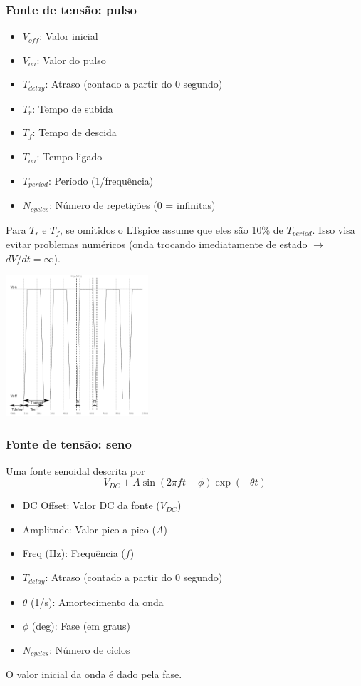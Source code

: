 \documentclass{beamer}
\begin{document}
\begin{frame} %
\frametitle{Fonte de tensão: pulso}
\begin{itemize}
\item {$V_{off}$}: Valor inicial
\item {$V_{on}$}: Valor do pulso
\item {$T_{delay}$}: Atraso (contado a partir do 0 segundo)
\item {$T_{r}$}: Tempo de subida 
\item {$T_{f}$}: Tempo de descida
\item {$T_{on}$}: Tempo ligado
\item {$T_{period}$}: Período (1/frequência)
\item {$N_{cycles}$}: Número de repetições (0 = infinitas)
\end{itemize}
Para $T_r$ e $T_f$, se omitidos o LTspice assume que eles são 10\% de $T_{period}$.
Isso visa evitar problemas numéricos (onda trocando imediatamente de estado $\rightarrow$ $dV/dt = \infty$).
\end{frame}


 \begin{frame}
 \begin{center}
 \includegraphics[width=200px]{images/square_wave}
 \end{center}
 \end{frame}
\begin{frame} %
\frametitle{Fonte de tensão: seno}
Uma fonte senoidal descrita por
\begin{equation}
V_{DC} + A \sin (2 \pi f t + \phi) \exp(-\theta t)
\end{equation}
\begin{itemize}
\item{DC Offset}: Valor DC da fonte ($V_{DC}$)
\item{Amplitude}: Valor pico-a-pico ($A$)
\item{Freq (Hz)}: Frequência ($f$)
\item{$T_{delay}$}: Atraso (contado a partir do 0 segundo)
\item{$\theta$ (1/s)}: Amortecimento da onda
\item{$\phi$ (deg)}: Fase (em graus)
\item{$N_{cycles}$}: Número de ciclos
\end{itemize}
O valor inicial da onda é dado pela fase.
\end{frame}
\end{document}
